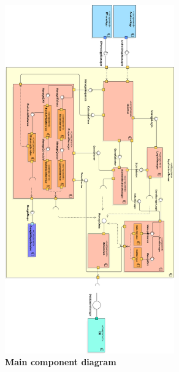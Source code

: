 \newpage
\begin{figure}[!h]
\centering
\includegraphics[width=0.65\textwidth]{Images/ComponentDiagram1v4Vert}
\caption{\label{fig:componentdiagram1}\textbf{Main component diagram}}
\end{figure}

\newpage

